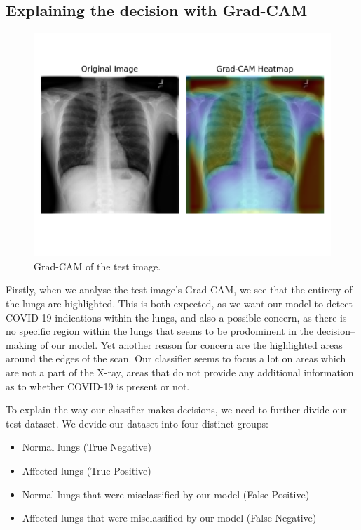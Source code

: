 \documentclass[conference]{IEEEtran}
\begin{document}
\subsection{Explaining the decision with Grad-CAM}

\begin{figure}[htbp]
	\centerline{\includegraphics[width=\linewidth]{Images/gradcam_test_image.png}}
	\caption{Grad-CAM of the test image.}
	\label{fig:gradcam_test_image}
\end{figure}

Firstly, when we analyse the test image's Grad-CAM, we see that the entirety of the lungs are highlighted. This is both expected, as we want our model to detect COVID-19 indications within the lungs, and also a possible concern, as there is no specific region within the lungs that seems to be prodominent in the decision–making of our model. Yet another reason for concern are the highlighted areas around the edges of the scan. Our classifier seems to focus a lot on areas which are not a part of the X-ray, areas that do not provide any additional information as to whether COVID-19 is present or not.

To explain the way our classifier makes decisions, we need to further divide our test dataset. We devide our dataset into four distinct groups:

\begin{itemize}
	\item Normal lungs (True Negative)
	\item Affected lungs (True Positive)
	\item Normal lungs that were misclassified by our model (False Positive)
	\item Affected lungs that were misclassified by our model (False Negative)
\end{itemize}
\vspace{0.5cm}
\end{document}
